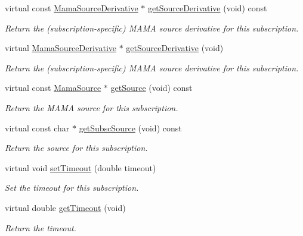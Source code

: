 \begin{DoxyCompactItemize}
virtual const \hyperlink{classWombat_1_1MamaSourceDerivative}{MamaSourceDerivative} $\ast$ \hyperlink{classWombat_1_1MamaSubscription_a4cca73373dc01f55978d85a13147f564}{getSourceDerivative} (void) const 
\begin{DoxyCompactList}\small\item\em Return the (subscription-\/specific) MAMA source derivative for this subscription. \item\end{DoxyCompactList}\item 
virtual \hyperlink{classWombat_1_1MamaSourceDerivative}{MamaSourceDerivative} $\ast$ \hyperlink{classWombat_1_1MamaSubscription_a075b024887338dd46962c78101793888}{getSourceDerivative} (void)
\begin{DoxyCompactList}\small\item\em Return the (subscription-\/specific) MAMA source derivative for this subscription. \item\end{DoxyCompactList}\item 
virtual const \hyperlink{classWombat_1_1MamaSource}{MamaSource} $\ast$ \hyperlink{classWombat_1_1MamaSubscription_a9a81ca79c7a43953a39a001542388b4b}{getSource} (void) const 
\begin{DoxyCompactList}\small\item\em Return the MAMA source for this subscription. \item\end{DoxyCompactList}\item 
virtual const char $\ast$ \hyperlink{classWombat_1_1MamaSubscription_a4c768efb3ce3bff36c6bbe1ad8d8abb3}{getSubscSource} (void) const 
\begin{DoxyCompactList}\small\item\em Return the source for this subscription. \item\end{DoxyCompactList}\item 
virtual void \hyperlink{classWombat_1_1MamaSubscription_a6e29abd97a8821db4b0d2af7989d8549}{setTimeout} (double timeout)
\begin{DoxyCompactList}\small\item\em Set the timeout for this subscription. \item\end{DoxyCompactList}\item 
virtual double \hyperlink{classWombat_1_1MamaSubscription_a921e36bfd97a95056519c98c5c4d5947}{getTimeout} (void)
\begin{DoxyCompactList}\small\item\em Return the timeout. \item\end{DoxyCompactList}\item 

\end{DoxyCompactItemize}
